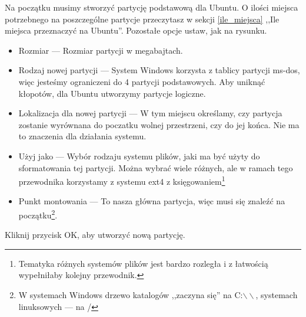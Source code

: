 Na początku musimy stworzyć partycję podstawową dla Ubuntu. O ilości miejsca potrzebnego na poszczególne partycje przeczytasz w sekcji \ref{ile_miejsca} ,,Ile miejsca przeznaczyć na Ubuntu''. Pozostałe opcje ustaw, jak na rysunku.
\begin{itemize}
\item \textcolor{ubuntu_orange}{Rozmiar} --- Rozmiar partycji w megabajtach.
\item \textcolor{ubuntu_orange}{Rodzaj nowej partycji} --- System Windows korzysta z tablicy partycji ms-dos, więc jesteśmy ograniczeni do 4 partycji podstawowych. Aby uniknąć kłopotów, dla Ubuntu utworzymy partycje logiczne.
\item \textcolor{ubuntu_orange}{Lokalizacja dla nowej partycji} --- W tym miejscu określamy, czy partycja zostanie wyrównana do poczatku wolnej przestrzeni, czy do jej końca. Nie ma to znaczenia dla działania systemu.
\item \textcolor{ubuntu_orange}{Użyj jako} --- Wybór rodzaju systemu plików, jaki ma być użyty do sformatowania tej partycji. Można wybrać wiele różnych, ale w ramach tego przewodnika korzystamy z systemu ext4 z księgowaniem\footnote{Tematyka różnych systemów plików jest bardzo rozległa i z łatwością wypełniłaby kolejny przewodnik.}
\item \textcolor{ubuntu_orange}{Punkt montowania} --- To nasza główna partycja, więc musi się znaleźć na początku\footnote{W systemach Windows drzewo katalogów ,,zaczyna się'' na C:$\backslash\backslash$,  systemach linuksowych --- na /}.
\end{itemize}
Kliknij przycisk \textcolor{ubuntu_orange}{OK}, aby utworzyć nową partycję.

